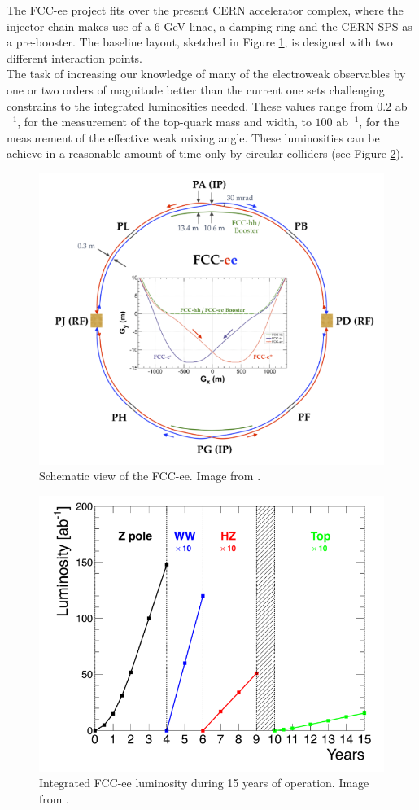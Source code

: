 The FCC-ee project fits over the present CERN accelerator complex, where the injector chain makes use of a $6$ GeV linac, a damping ring and the CERN SPS as a pre-booster. The baseline layout, sketched in Figure \ref{fig:FCC-ee}, is designed with two different interaction points.\\
The task of increasing our knowledge of many of the electroweak observables by one or two orders of magnitude better than the current one sets challenging constrains to the integrated luminosities needed. These values range from $0.2$ ab$^{-1}$, for the measurement of the top-quark mass and width, to $100$ ab$^{-1}$, for the measurement of the effective weak mixing angle.
These luminosities can be achieve in a reasonable amount of time only by circular colliders (see Figure \ref{fig:FCC-ee_lum}). 

\begin{figure}
	\centering
	\includegraphics[width=.65\textwidth]{IMG/Cap1/FCC-ee.png}
	\caption{Schematic view of the FCC-ee. Image from \cite{FCC}.}
	\label{fig:FCC-ee}
\end{figure}

\begin{figure}
	\centering
	\includegraphics[width=.7\textwidth]{IMG/Cap1/FCC-ee_lum.png}
	\caption{Integrated FCC-ee luminosity during 15 years of operation. Image from \cite{FCC-ee}.}
	\label{fig:FCC-ee_lum}
\end{figure}


